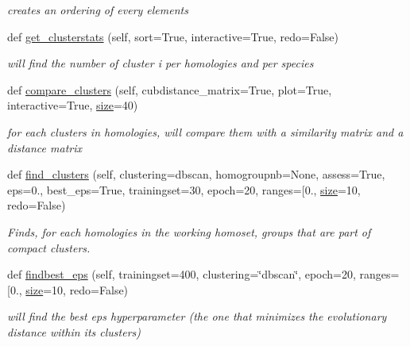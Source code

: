 \begin{DoxyCompactItemize}
\begin{DoxyCompactList}\small\item\em creates an ordering of every elements \end{DoxyCompactList}\item 
def \mbox{\hyperlink{class_py_c_u_b_1_1homoset_1_1_homo_set_aa41e2430673cf29f96a522e03040ca1d}{get\+\_\+clusterstats}} (self, sort=True, interactive=True, redo=False)
\begin{DoxyCompactList}\small\item\em will find the number of cluster i per homologies and per species \end{DoxyCompactList}\item 
def \mbox{\hyperlink{class_py_c_u_b_1_1homoset_1_1_homo_set_ae429c30197127c5d6248c94dbb6dfc46}{compare\+\_\+clusters}} (self, cubdistance\+\_\+matrix=True, plot=True, interactive=True, \mbox{\hyperlink{class_py_c_u_b_1_1homoset_1_1_homo_set_a000511647e3f85d8abadcdddaddfb04d}{size}}=40)
\begin{DoxyCompactList}\small\item\em for each clusters in homologies, will compare them with a similarity matrix and a distance matrix \end{DoxyCompactList}\item 
def \mbox{\hyperlink{class_py_c_u_b_1_1homoset_1_1_homo_set_a81b40822ff0d1d3e0cfccd6c3c54cdd6}{find\+\_\+clusters}} (self, clustering=\textquotesingle{}dbscan\textquotesingle{}, homogroupnb=None, assess=True, eps=0., best\+\_\+eps=True, trainingset=30, epoch=20, ranges=\mbox{[}0., \mbox{\hyperlink{class_py_c_u_b_1_1homoset_1_1_homo_set_a000511647e3f85d8abadcdddaddfb04d}{size}}=10, redo=False)
\begin{DoxyCompactList}\small\item\em Finds, for each homologies in the working homoset, groups that are part of compact clusters. \end{DoxyCompactList}\item 
def \mbox{\hyperlink{class_py_c_u_b_1_1homoset_1_1_homo_set_a36e6e64142f4cc63425f145a1754d1d6}{findbest\+\_\+eps}} (self, trainingset=400, clustering=\char`\"{}dbscan\char`\"{}, epoch=20, ranges=\mbox{[}0., \mbox{\hyperlink{class_py_c_u_b_1_1homoset_1_1_homo_set_a000511647e3f85d8abadcdddaddfb04d}{size}}=10, redo=False)
\begin{DoxyCompactList}\small\item\em will find the best eps hyperparameter (the one that minimizes the evolutionary distance within its clusters) \end{DoxyCompactList}\item 

\end{DoxyCompactItemize}
